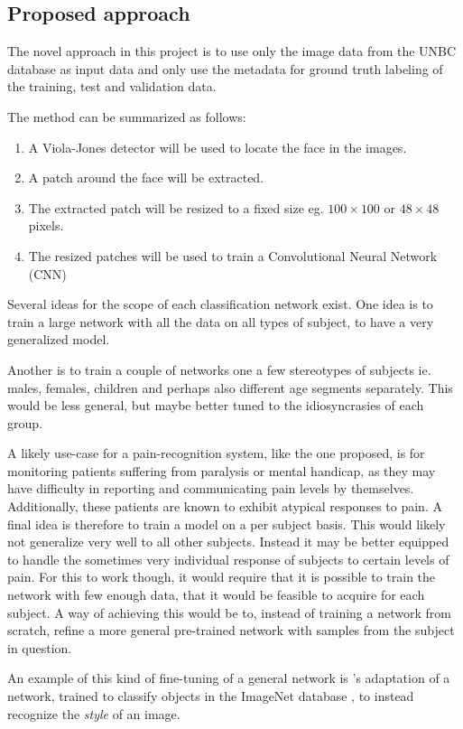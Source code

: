 \documentclass[Main]{subfiles}
\begin{document}

	\subsection{Proposed approach} %
		\label{sub:proposed_approach}
		The novel approach in this project is to use only the image data from the UNBC database as input data and only use the metadata for ground truth labeling of the training, test and validation data.

		The method can be summarized as follows:
		\begin{enumerate}
			\item 
			A Viola-Jones detector \cite{Viola2001} will be used to locate the face in the images.
			
			\item 
			A patch around the face will be extracted.

			\item
			The extracted patch will be resized to a fixed size eg. $100 \times 100$ or $48 \times 48$ pixels.

			\item
			The resized patches will be used to train a Convolutional Neural Network (CNN)

		\end{enumerate}

		Several ideas for the scope of each classification network exist.
		One idea is to train a large network with all the data on all types of subject, to have a very generalized model.

		Another is to train a couple of networks one a few stereotypes of subjects ie. males, females, children and perhaps also different age segments separately. This would be less general, but maybe better tuned to the idiosyncrasies of each group.

		A likely use-case for a pain-recognition system, like the one proposed, is for monitoring patients suffering from paralysis or mental handicap, as they may have difficulty in reporting and communicating pain levels by themselves.
		Additionally, these patients are known to exhibit atypical responses to pain.
		A final idea is therefore to train a model on a per subject basis.
		This would likely not generalize very well to all other subjects.
		Instead it may be better equipped to handle the sometimes very individual response of subjects to certain levels of pain.
		For this to work though, it would require that it is possible to train the network with few enough data, that it would be feasible to acquire for each subject.
		A way of achieving this would be to, instead of training a network from scratch, refine a more general pre-trained network with samples from the subject in question.

		An example of this kind of fine-tuning of a general network is \citeauthor{DBLP:journals/corr/KarayevHWAD13}'s \cite{DBLP:journals/corr/KarayevHWAD13} adaptation of a network, trained to classify objects in the ImageNet database \cite{Deng09imagenet:a}, to instead recognize the \emph{style} of an image.

	
\end{document}
